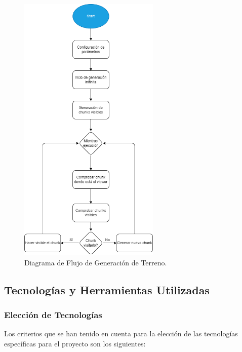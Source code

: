 \begin{figure}[H]
    \centering
    \includegraphics[width=0.6\textwidth]{img/FlowDiagramgeneracionInfinita.png}
    \caption{Diagrama de Flujo de Generación de Terreno.}
\end{figure}


\subsection{Tecnologías y Herramientas Utilizadas}

\subsubsection{Elección de Tecnologías}
Los criterios que se han tenido en cuenta para la elección de las tecnologías específicas para el proyecto son los siguientes:

